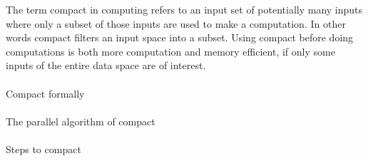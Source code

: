 The term compact in computing refers to an input set of potentially many inputs where only a subset of those inputs are used to make a computation.
In other words compact filters an input space into a subset.
Using compact before doing computations is both more computation and memory efficient, if only some inputs of the entire data space are of interest.
\\\\
Compact formally\\\\
The parallel algorithm of compact\\\\
Steps to compact\\\\